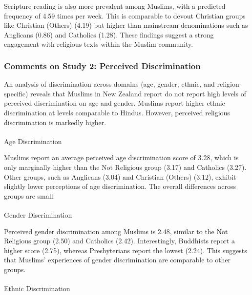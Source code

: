 \documentclass[
  single column]{article}
\makeatletter
\let\oldparagraph\paragraph
\renewcommand{\paragraph}{
    \@ifstar
      \xxxParagraphStar
      \xxxParagraphNoStar
  }
\newcommand{\xxxParagraphStar}[1]{\oldparagraph*{#1}\mbox{}}
\newcommand{\xxxParagraphNoStar}[1]{\oldparagraph{#1}\mbox{}}
\makeatother
\begin{document}
Scripture reading is also more prevalent among Muslims, with a predicted
frequency of 4.59 times per week. This is comparable to devout Christian
groups like Christian (Others) (4.19) but higher than mainstream
denominations such as Anglicans (0.86) and Catholics (1.28). These
findings suggest a strong engagement with religious texts within the
Muslim community.

\subsubsection{Comments on Study 2: Perceived
Discrimination}\label{comments-on-study-2-perceived-discrimination}

An analysis of discrimination across domains (age, gender, ethnic, and
religion-specific) reveals that Muslims in New Zealand report do not
report high levels of perceived discrimination on age and gender.
Muslims report higher ethnic discrimination at levels comparable to
Hindus. However, perceived religious discrimination is markedly higher.

\paragraph{Age Discrimination}\label{age-discrimination}

Muslims report an average perceived age discrimination score of 3.28,
which is only marginally higher than the Not Religious group (3.17) and
Catholics (3.27). Other groups, such as Anglicans (3.04) and Christian
(Others) (3.12), exhibit slightly lower perceptions of age
discrimination. The overall differences across groups are small.

\paragraph{Gender Discrimination}\label{gender-discrimination}

Perceived gender discrimination among Muslims is 2.48, similar to the
Not Religious group (2.50) and Catholics (2.42). Interestingly,
Buddhists report a higher score (2.75), whereas Presbyterians report the
lowest (2.24). This suggests that Muslims' experiences of gender
discrimination are comparable to other groups.

\paragraph{Ethnic Discrimination}\label{ethnic-discrimination}
\end{document}
